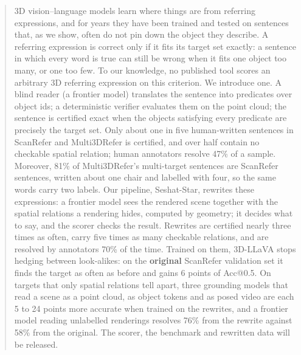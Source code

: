 \begin{abstract}
3D vision--language models learn where things are from referring expressions, and for years they have been trained and tested on sentences that, as we show, often do not pin down the object they describe. A referring expression is correct only if it fits its target set exactly: a sentence in which every word is true can still be wrong when it fits one object too many, or one too few. To our knowledge, no published tool scores an arbitrary 3D referring expression on this criterion. We introduce one. A blind reader (a frontier model) translates the sentence into predicates over object ids; a deterministic verifier evaluates them on the point cloud; the sentence is certified exact when the objects satisfying every predicate are precisely the target set. Only about one in five human-written sentences in ScanRefer and Multi3DRefer is certified, and over half contain no checkable spatial relation; human annotators resolve 47\% of a sample. Moreover, 81\% of Multi3DRefer's multi-target sentences are ScanRefer sentences, written about one chair and labelled with four, so the same words carry two labels. Our pipeline, Seshat-Star, rewrites these expressions: a frontier model sees the rendered scene together with the spatial relations a rendering hides, computed by geometry; it decides what to say, and the scorer checks the result. Rewrites are certified nearly three times as often, carry five times as many checkable relations, and are resolved by annotators 70\% of the time. Trained on them, 3D-LLaVA stops hedging between look-alikes: on the \textbf{original} ScanRefer validation set it finds the target as often as before and gains 6 points of Acc@0.5. On targets that only spatial relations tell apart, three grounding models that read a scene as a point cloud, as object tokens and as posed video are each 5 to 24 points more accurate when trained on the rewrites, and a frontier model reading unlabelled renderings resolves 76\% from the rewrite against 58\% from the original. %
The scorer, the benchmark and rewritten data will be released.
\end{abstract}
